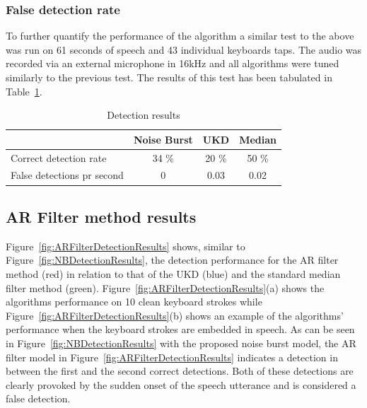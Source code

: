 \subsubsection{False detection rate}
To further quantify the performance of the algorithm a similar test to the above was run on 61 seconds of speech and 43 individual keyboards taps. The audio was recorded via an external microphone in 16kHz and all algorithms were tuned similarly to the previous test. The results of this test has been tabulated in Table~\ref{table:NBResultsTest}.

\begin{table}
\caption{Detection results}
\centering
\begin{tabular}{|l | c c c|}
\hline
                            & Noise Burst   & UKD       & Median        \\
 \hline
 Correct detection rate     & 34 \%         & 20 \%     & 50 \%         \\
 False detections pr second & 0             & 0.03      & 0.02          \\
 \hline
 \end{tabular}
 \label{table:NBResultsTest}
\end{table}

\subsection{AR Filter method results}
Figure~\ref{fig:ARFilterDetectionResults} shows, similar to Figure~\ref{fig:NBDetectionResults}, the detection performance for the AR filter method (red) in relation to that of the UKD\cite{Subramanya2007} (blue) and the standard median filter method (green). Figure~\ref{fig:ARFilterDetectionResults}(a) shows the algorithms performance on 10 clean keyboard strokes while Figure~\ref{fig:ARFilterDetectionResults}(b) shows an example of the algorithms' performance when the keyboard strokes are embedded in speech. As can be seen in Figure~\ref{fig:NBDetectionResults} with the proposed noise burst model, the AR filter model in Figure~\ref{fig:ARFilterDetectionResults} indicates a detection in between the first and the second correct detections. Both of these detections are clearly provoked by the sudden onset of the speech utterance and is considered a false detection.


